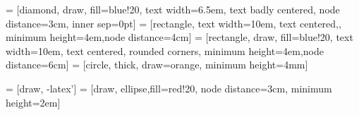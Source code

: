 \documentclass{article}
\begin{document}
\pagestyle{empty}

 = [diamond, draw, fill=blue!20,
    text width=6.5em, text badly centered, node distance=3cm, inner sep=0pt]
 = [rectangle,
    text width=10em, text centered,, minimum height=4em,node distance=4cm]
 = [rectangle, draw, fill=blue!20,
    text width=10em, text centered, rounded corners, minimum height=4em,node distance=6cm]
 = [circle, thick, draw=orange, minimum height=4mm]

 = [draw, -latex']
 = [draw, ellipse,fill=red!20, node distance=3cm,
    minimum height=2em]

\end{document}

